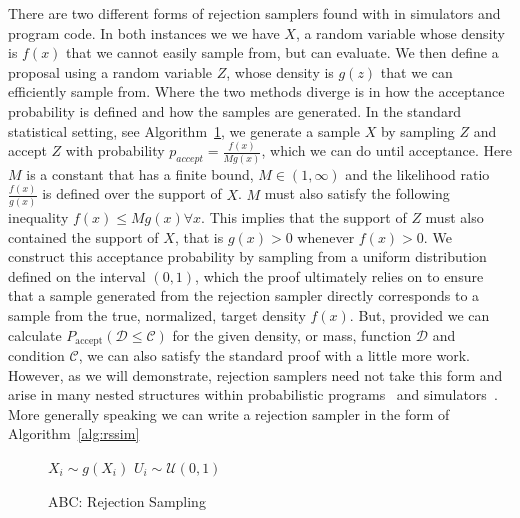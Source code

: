 \documentclass{article}
\begin{document}
There are two different forms of rejection samplers found with in simulators and program code. 
In both instances we we have $X$, a random variable whose density is $f(x)$ that we cannot easily 
sample from, but can evaluate.
We then define a proposal using a random variable $Z$, whose density is $g(z)$  that we can efficiently
sample from.
Where the two methods diverge is in how the acceptance probability is defined and how the samples are generated.
In the standard statistical setting, see Algorithm~\ref{alg:rsstats}, we generate a sample $X$ by sampling $Z$ and accept $Z$ with probability
$p_{accept} = \frac{f(x)}{Mg(x)}$, which we can do until acceptance. 
Here $M$ is a constant that has a finite bound, $M \in (1, \infty)$ and the likelihood ratio $\frac{f(x)}{g(x)}$ is defined over the 
support of $X$. 
$M$ must also satisfy the following inequality $f(x) \leq M g(x)  \forall x$. 
This implies that the support of $Z$ must also contained the support of $X$, that is
$g(x) > 0$ whenever $f(x)>0$. 
We construct this acceptance probability by sampling from a uniform distribution defined on the interval 
$(0,1)$, which the proof ultimately relies on to ensure that a sample generated from the rejection sampler directly 
corresponds to a sample from the true, normalized, target density $f(x)$. 
But, provided we can calculate $P_{\text{accept}}(\mathcal{D} \leq \mathcal{C})$ for the given density, or mass, function
 $\mathcal{D}$ and condition $\mathcal{C}$, we can also satisfy the standard proof with a little more work.
 However, as we will demonstrate, rejection samplers 
 need not take this form and arise in many nested structures within probabilistic programs~\cite{rainforth2018nesting} and simulators~\cite{smith2008towards,bershteyn2018implementation,gleisberg2009event}.
 More generally speaking we can write a rejection sampler in the form of Algorithm~\ref{alg:rssim}
\begin{figure}
 \begin{minipage}{0.40\textwidth}
  \null 
   \begin{algorithm}[H]
   \caption{ABC: Rejection Sampling}
   \label{alg:rsstats}
      \begin{algorithmic}
       \State $X_{i} \sim g(X_{i})$ 
       \State $U_{i} \sim \mathcal{U}(0,1)$
       \Else
       \EndIf
      \end{algorithmic}
    \end{algorithm}
  \end{minipage}%
\end{figure}
\end{document}
